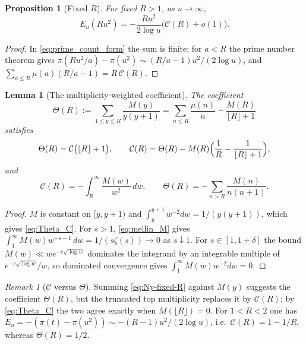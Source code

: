 \documentclass[11pt]{amsart}
\numberwithin{equation}{section}
\theoremstyle{plain}
\newtheorem{proposition}[theorem]{Proposition}
\newtheorem{lemma}[theorem]{Lemma}
\theoremstyle{definition}
\theoremstyle{remark}
\newtheorem{remark}[theorem]{Remark}
\newcommand{\Cc}{\mathcal{C}}
\begin{document}
\begin{proposition}[Fixed $R$]
\label{prop:fixed_R_corrected}
For fixed $R>1$, as $u\to\infty$,
\begin{equation}
\label{eq:E_fixed_R}
  E_u(Ru^2)=-\frac{Ru^2}{2\log u}\bigl(\Cc(R)+o(1)\bigr).
\end{equation}
\end{proposition}

\begin{proof}
In \eqref{eq:prime_count_form} the sum is finite; for $a<R$ the prime number
theorem gives $\pi(Ru^2/a)-\pi(u^2)\sim(R/a-1)u^2/(2\log u)$, and
$\sum_{a\le R}\mu(a)(R/a-1)=R\,\Cc(R)$.
\end{proof}

\begin{lemma}[The multiplicity-weighted coefficient]
\label{lem:copy-weight-coefficient}
The coefficient
\begin{equation}
\label{eq:Theta_def}
  \Theta(R):=\sum_{1\le y\le R}\frac{M(y)}{y(y+1)}
  =\sum_{n\le R}\frac{\mu(n)}n-\frac{M(R)}{\lfloor R\rfloor+1}
\end{equation}
satisfies
\begin{equation}
\label{eq:Theta_C}
  \Theta(R)=\Cc\bigl(\lfloor R\rfloor+1\bigr),\qquad
  \Cc(R)=\Theta(R)-M(R)\Bigl(\frac1R-\frac1{\lfloor R\rfloor+1}\Bigr),
\end{equation}
and
\begin{equation}
\label{eq:C_tail}
  \Cc(R)=-\int_R^\infty\frac{M(w)}{w^2}\,dw,\qquad
  \Theta(R)=-\sum_{n>R}\frac{M(n)}{n(n+1)}.
\end{equation}
\end{lemma}

\begin{proof}
$M$ is constant on $[y,y+1)$ and $\int_y^{y+1}w^{-2}dw=1/(y(y+1))$, which
gives \eqref{eq:Theta_C}. For $s>1$, \eqref{eq:mellin_M} gives
$\int_1^\infty M(w)w^{-s-1}\,dw=1/(s\zeta(s))\to0$ as $s\downarrow1$. For
$s\in[1,1+\delta]$ the bound $M(w)\ll we^{-c\sqrt{\log w}}$ dominates the
integrand by an integrable multiple of $e^{-c\sqrt{\log w}}/w$, so dominated
convergence gives $\int_1^\infty M(w)w^{-2}dw=0$.
\end{proof}

\begin{remark}[$\Cc$ versus $\Theta$]
\label{rem:C-vs-Theta}
Summing \eqref{eq:Ny-fixed-R} against $M(y)$ suggests the coefficient
$\Theta(R)$, but the truncated top multiplicity replaces it by $\Cc(R)$; by
\eqref{eq:Theta_C} the two agree exactly when $M(\lfloor R\rfloor)=0$. For
$1<R<2$ one has $E_u=-(\pi(t)-\pi(u^2))\sim-(R-1)u^2/(2\log u)$, i.e.\
$\Cc(R)=1-1/R$, whereas $\Theta(R)=1/2$.
\end{remark}
\end{document}
